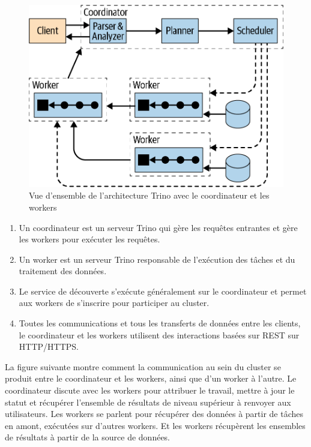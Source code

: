 \begin{figure}[htbp]
\centering
\includegraphics[width=\linewidth]{images/trino_architecture.png}
\caption{Vue d'ensemble de l'architecture Trino avec le coordinateur et les workers}\label{fig:trino-architecture}
\end{figure}

\begin{enumerate}
	\item Un coordinateur est un serveur Trino qui gère les requêtes entrantes et gère les workers pour exécuter les requêtes.
	\item Un worker est un serveur Trino responsable de l'exécution des tâches et du traitement des données.
	\item Le service de découverte s'exécute généralement sur le coordinateur et permet aux workers de s'inscrire pour participer au cluster.
	\item Toutes les communications et tous les transferts de données entre les clients, le coordinateur et les workers utilisent des interactions basées sur REST sur HTTP/HTTPS.
\end{enumerate}

La figure suivante montre comment la communication au sein du cluster se produit entre le coordinateur et les workers, ainsi que d'un worker à l'autre. Le coordinateur discute avec les workers pour attribuer le travail, mettre à jour le statut et récupérer l'ensemble de résultats de niveau supérieur à renvoyer aux utilisateurs. Les workers se parlent pour récupérer des données à partir de tâches en amont, exécutées sur d'autres workers. Et les workers récupèrent les ensembles de résultats à partir de la source de données.

